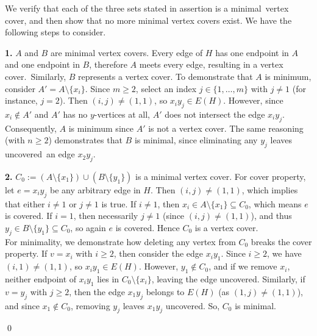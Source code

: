 \documentclass[12pt]{article}
\renewenvironment{proof}{{\noindent\bfseries Proof.}}{\qed}
\theoremstyle{plain}
\theoremstyle{definition}
\newcommand{\A}{A}
\newcommand{\B}{B}
\begin{document}
	\begin{proof}
		We verify that each of the three sets stated in assertion is a minimal vertex cover, and then show that no more minimal vertex covers exist. We have the following steps to consider.
		
		\smallskip\noindent
		\textbf{1.} $\A$ and $\B$ are minimal vertex covers. Every edge of $H$ has one endpoint in $\A$ and one endpoint in $\B$, therefore $\A$ meets every edge, resulting in a vertex cover. Similarly, $\B$ represents a vertex cover.
		 To demonstrate that $\A$ is minimum, consider $\A'=\A\setminus\{x_i\}$.
		Since $m\ge 2$, select an index $j\in\{1,\dots,m\}$ with $j\neq 1$ (for instance, $j=2$).
		Then $(i,j)\neq (1,1)$, so $x_i y_j\in E(H)$. However, since $x_i\notin \A'$ and $\A'$ has no $y$-vertices at all, $\A'$ does not intersect the edge $x_i y_j$. Consequently, $\A$ is minimum since $\A'$ is not a vertex cover.
		The same reasoning (with $n\ge 2$) demonstrates that $\B$ is minimal, since eliminating any $y_j$ leaves uncovered an edge $x_2y_j$.
		
		\smallskip\noindent
		\textbf{2.} $C_0:=(\A\setminus\{x_1\})\cup(\B\setminus\{y_1\})$ is a minimal vertex cover.  For	cover property, let $e=x_i y_j$ be any arbitrary edge in $H$. Then $(i,j)\neq(1,1)$, which implies that either $i\neq 1$ or $j\neq 1$ is true.
		If $i\neq 1$, then $x_i\in \A\setminus\{x_1\}\subseteq C_0$, which means $e$ is covered.
		If $i=1$, then necessarily $j\neq 1$ (since $(i,j)\neq(1,1)$), and thus $y_j\in \B\setminus\{y_1\}\subseteq C_0$,
		so again $e$ is covered. Hence $C_0$ is a vertex cover.\\
		For minimality, we demonstrate how deleting any vertex from $C_0$ breaks the cover property.
		If $v=x_i$ with $i\ge 2$, then consider the edge $x_i y_1$. Since $i\ge 2$, we have $(i,1)\neq (1,1)$, so $x_i y_1\in E(H)$.
		However, $y_1\notin C_0$, and if we remove $x_i$, neither endpoint of $x_i y_1$ lies in $C_0\setminus\{x_i\}$, leaving the edge uncovered.
		Similarly, if $v=y_j$ with $j\ge 2$, then the edge $x_1 y_j$ belongs to $E(H)$ (as $(1,j)\neq(1,1)$), and since $x_1\notin C_0$,
		removing $y_j$ leaves $x_1 y_j$ uncovered. So, $C_0$ is minimal.
		

\end{proof}
\end{document}
